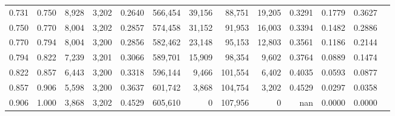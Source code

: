 \begin{tabular}{rrrrrrrrrrrrr}
0.731 & 0.750 &  8,928 & 3,202 &                                     0.2640 & 566,454 &  39,156 &  88,751 &  19,205 & 0.3291 & 0.1779 & 0.3627 \\
0.750 & 0.770 &  8,004 & 3,202 &                                     0.2857 & 574,458 &  31,152 &  91,953 &  16,003 & 0.3394 & 0.1482 & 0.2886 \\
0.770 & 0.794 &  8,004 & 3,200 &                                     0.2856 & 582,462 &  23,148 &  95,153 &  12,803 & 0.3561 & 0.1186 & 0.2144 \\
0.794 & 0.822 &  7,239 & 3,201 &                                     0.3066 & 589,701 &  15,909 &  98,354 &   9,602 & 0.3764 & 0.0889 & 0.1474 \\
0.822 & 0.857 &  6,443 & 3,200 &                                     0.3318 & 596,144 &   9,466 & 101,554 &   6,402 & 0.4035 & 0.0593 & 0.0877 \\
0.857 & 0.906 &  5,598 & 3,200 &                                     0.3637 & 601,742 &   3,868 & 104,754 &   3,202 & 0.4529 & 0.0297 & 0.0358 \\
0.906 & 1.000 &  3,868 & 3,202 &                                     0.4529 & 605,610 &       0 & 107,956 &       0 &    nan & 0.0000 & 0.0000 \\
\bottomrule
\end{tabular}
